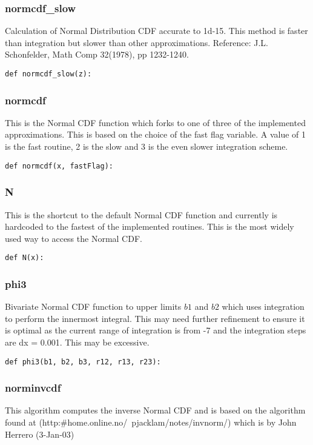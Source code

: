 \documentclass[twoside,11pt]{book}
\begin{document}
\subsubsection*{{\bf normcdf\_slow}}
Calculation of Normal Distribution CDF accurate to 1d-15. This method is faster than integration but slower than other approximations. Reference: J.L. Schonfelder, Math Comp 32(1978), pp 1232-1240.  

\begin{lstlisting}
def normcdf_slow(z):
\end{lstlisting}

\subsubsection*{{\bf normcdf}}
This is the Normal CDF function which forks to one of three of the implemented approximations. This is based on the choice of the fast flag variable. A value of 1 is the fast routine, 2 is the slow and 3 is the even slower integration scheme.  

\begin{lstlisting}
def normcdf(x, fastFlag):
\end{lstlisting}

\subsubsection*{{\bf N}}
This is the shortcut to the default Normal CDF function and currently is hardcoded to the fastest of the implemented routines. This is the most widely used way to access the Normal CDF.  

\begin{lstlisting}
def N(x):
\end{lstlisting}

\subsubsection*{{\bf phi3}}
Bivariate Normal CDF function to upper limits $b1$ and $b2$ which uses integration to perform the innermost integral. This may need further refinement to ensure it is optimal as the current range of integration is from -7 and the integration steps are dx = 0.001. This may be excessive. 

\begin{lstlisting}
def phi3(b1, b2, b3, r12, r13, r23):
\end{lstlisting}

\subsubsection*{{\bf norminvcdf}}
This algorithm computes the inverse Normal CDF and is based on the algorithm found at (http:\#home.online.no/~pjacklam/notes/invnorm/) which is by John Herrero (3-Jan-03)  
\end{document}
